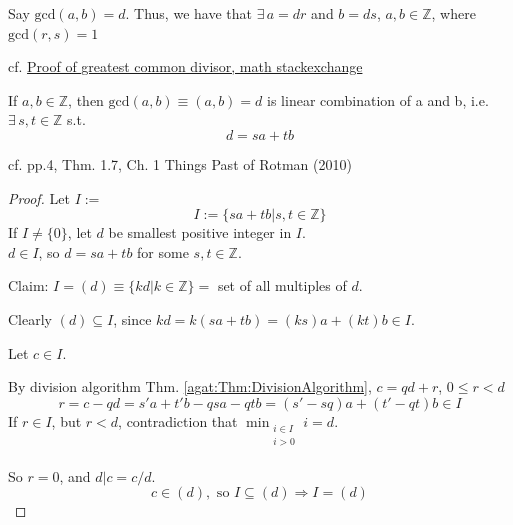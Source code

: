 \begin{definition}
Say $\text{gcd}(a, b) = d$. Thus, we have that $\exists \,  a = dr$ and $b = ds$, $a, b\in \mathbb{Z}$, where $\text{gcd}(r, s) = 1$
\end{definition}
cf. \href{https://math.stackexchange.com/questions/1535408/proof-of-greatest-common-divisor}{Proof of greatest common divisor, math stackexchange}


\begin{theorem}\label{agat:Thm:lincombgcd}
	If $a,b\in \mathbb{Z}$, then $\text{gcd}(a,b) \equiv (a,b)=d$ is linear combination of a and b, i.e. $\exists \, s,t \in \mathbb{Z}$ s.t.
\begin{equation}
d= sa + tb
\end{equation}
\end{theorem}
cf. pp.4, Thm. 1.7, Ch. 1 Things Past of Rotman (2010) \cite{agat:JRotman2010}

\begin{proof}
Let $I:=$ 
\[
I :=\lbrace sa+tb|s,t\in \mathbb{Z} \rbrace
\]
If $I\neq \lbrace 0 \rbrace$, let $d$ be smallest positive integer in $I$.   \\
$d\in I$, so $d=sa + tb$ for some $s,t\in \mathbb{Z}$.  

Claim: $I=(d) \equiv \lbrace kd| k\in \mathbb{Z} \rbrace = $ set of all multiples of $d$.  

Clearly $(d)\subseteq I$, since $kd=k(sa+tb) = (ks)a+(kt)b\in I$.  

Let $c\in I$.  

By division algorithm Thm. \ref{agat:Thm:DivisionAlgorithm}, $c=qd + r$, $0\leq r <d$
\[
r=c-qd = s'a+t'b - qsa - qtb = (s'-sq)a + (t'-qt)b \in I
\]
If $r\in I$, but $r<d$, contradiction that $\min_{ \substack{ i \in I \\ i>0 \\ } } i =d$.  

So $r=0$, and $d|c=c/d$.  
\[
c \in (d), \text{ so } I\subseteq (d) \Longrightarrow I =(d)
\]
\end{proof}


